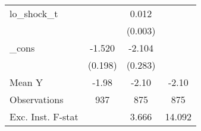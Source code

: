 {\begin{tabular}{l*{3}{c}}
\addlinespace
lo\_shock\_t  &                     &       0.012\sym{***}&                     \\
            &                     &     (0.003)         &                     \\
\addlinespace
\_cons      &      -1.520\sym{***}&      -2.104\sym{***}&                     \\
            &     (0.198)         &     (0.283)         &                     \\
\midrule
Mean Y      &       -1.98         &       -2.10         &       -2.10         \\
Observations&         937         &         875         &         875         \\
Exc. Inst. F-stat&                     &       3.666         &      14.092         \\
\bottomrule
\end{tabular}
}
